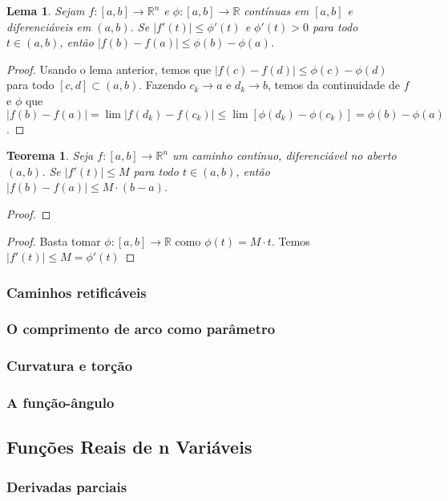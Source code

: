 \documentclass{article}
\theoremstyle{theorem}
\newtheorem{teo}{Teorema}
\theoremstyle{lemma}
\newtheorem{lema}{Lema}
\theoremstyle{definition}
\theoremstyle{remark}
\begin{document}
   \begin{lema}
	   Sejam \(f:[a,b] \to \mathbb{R}^n\) e \(\phi: [a,b] \to \mathbb{R}\) contínuas em \([a,b]\) e diferenciáveis em \( (a,b) \). Se \(|f'(t)  | \leq \phi'(t) \) e \(\phi'(t) > 0 \) para todo \( t\in (a,b) \), então \( |f(b) - f(a) | \leq \phi(b) - \phi(a) \).
   \end{lema}
   \begin{proof}
	   Usando o lema anterior, temos que \( |f(c) - f(d)| \leq \phi(c) - \phi(d)\) para todo \([c,d] \subset (a,b)\). Fazendo \(c_k\to a\) e \(d_k\to b\), temos da continuidade de \(f\) e \(\phi\) que \(|f(b) - f(a)| = \lim |f(d_k) - f(c_k)| \leq \lim [ \phi(d_k) - \phi(c_k) ] = \phi(b) - \phi(a) \).

   \end{proof}
   \begin{teo}
	   Seja \(f:[a,b] \to \mathbb{R}^n\) um caminho contínuo, diferenciável no aberto \( (a,b) \). Se \( |f'(t)| \leq M\) para todo \( t\in (a,b) \), então \( |f(b) - f(a)| \leq M \cdot (b-a) \).
   \end{teo}
   \begin{proof}
	   
   \end{proof}
   \begin{proof}
	   Basta tomar \(\phi:[a,b] \to \mathbb{R}\) como \(\phi(t) = M\cdot t\). Temos \( |f'(t)| \leq  M = \phi'(t) \) 
   \end{proof}
   \subsubsection{ Caminhos retificáveis}
   \subsubsection{ O comprimento de arco como parâmetro}
   \subsubsection{ Curvatura e torção}
   \subsubsection{ A função-ângulo}
\subsection{ Funções Reais de n Variáveis}
   \subsubsection{Derivadas parciais}
\end{document}
